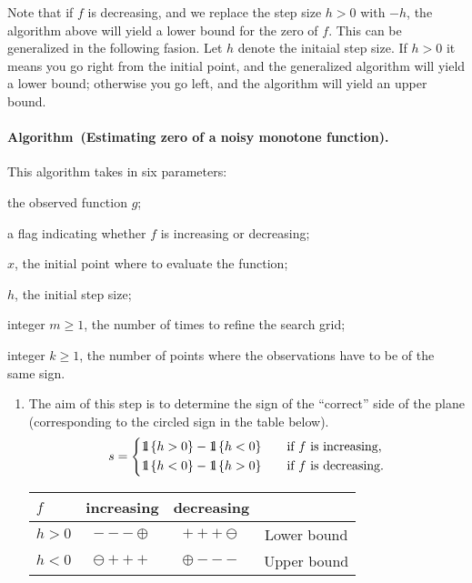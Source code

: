 \documentclass[12pt]{article}
\renewcommand{\geq}{\geqslant}
\newcommand{\set}[1]{\left\{ #1 \right\}}
\newcommand{\One}{\mathchoice{\rm 1\mskip-4.2mu l}{\rm 1\mskip-4.2mu l}{\rm 1\mskip-4.6mu l}{\rm 1\mskip-5.2mu l}}
\newenvironment{algorithm}[1][]{\paragraph*{Algorithm#1.}}{\vspace{1ex}}
\begin{document}
Note that if $f$ is decreasing, and we replace the step size $h > 0$ with $-h$, the algorithm above will yield a lower bound for the zero of $f$. This can be generalized in the following fasion.
Let $h$ denote the initaial step size. If $h > 0$ it means you go right from the initial point, and the generalized algorithm will yield a lower bound; otherwise you go left, and the algorithm will yield an upper bound.


\begin{algorithm}[~(Estimating zero of a noisy monotone function)]
    This algorithm takes in six parameters: \begin{inparaenum}[(i)]
        \item the observed function $g$;
        \item a flag indicating whether $f$ is increasing or decreasing;
        \item $x$, the initial point where to evaluate the function;
        \item $h$, the initial step size;
        \item integer $m \geq 1$, the number of times to refine the search grid;
        \item integer $k \geq 1$, the number of points where the observations have to be of the same sign.
    \end{inparaenum}
    \begin{enumerate}
        \item
            The aim of this step is to determine the sign of the ``correct'' side of the plane (corresponding to the circled sign in the table below).
            \[
                s = \begin{dcases}
                    \One \set{h > 0} - \One \set{h < 0} & \quad \text{if $f$ is increasing}, \\
                    \One \set{h < 0} - \One \set{h > 0} & \quad \text{if $f$ is decreasing}. \\
                \end{dcases}
            \]
            \begin{center}
                \begin{tabular}{ | l | c | c | c | }
                    \hline
                    $f$      & increasing  & decreasing                    & \\ \hline
                    $h > 0$  & ${-}{-}{-}\oplus $   & ${+}{+}{+}\ominus $  & Lower bound \\ \hline
                    $h < 0$  & $\ominus {+}{+}{+}$  & $\oplus {-}{-}{-}$   & Upper bound \\ \hline
                \end{tabular}
            \end{center}


\end{enumerate}
\end{algorithm}
\end{document}
